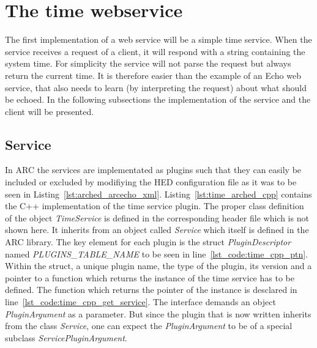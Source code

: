 \chapter{The time webservice}


The first implementation of a web service will be a simple time service. 
When the service receives a request of a client, it will respond with a string containing the system time.
For simplicity the service will not parse the request but always return the current time.
It is therefore easier than the example of an Echo web service, that also needs to learn (by interpreting the request)
about what should be echoed.
In the following subsections the implementation of the service and the client will be presented. 


\section{Service}

In ARC the services are implementated as plugins such that they can easily be included or excluded by modifiying the HED configuration file as it was to be seen in Listing~\ref{lst:arched_arcecho_xml}.
Listing~\ref{lst:time_arched_cpp} contains the C++ implementation of the time service plugin.
The proper class definition of the object \textit{TimeService} is defined in the corresponding header file which is not shown here. 
It inherits from an object called \textit{Service} which itself is defined in the ARC library.
The key element for each plugin is the struct \textit{PluginDescriptor} named \textit{PLUGINS\_TABLE\_NAME} to be seen in line~\ref{lst_code:time_cpp_ptn}. 
Within the struct, a unique plugin name, the type of the plugin, its version and a pointer to a function which returns the instance of the time service has to be defined.
The function which returns the pointer of the instance is desclared in line~\ref{lst_code:time_cpp_get_service}. 
The interface demands an object \textit{PluginArgument} as a parameter. But since the plugin that is now written inherits from the class \textit{Service}, one can expect the \textit{PluginArgument} to be of a special subclass \textit{ServicePluginArgument}.

